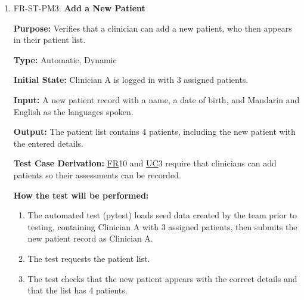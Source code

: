 \documentclass[12pt, titlepage]{article}
\newcommand{\srsfr}[1]{\href{https://github.com/Nour-Fawaz/MacaBoca/blob/main/pdfs/SRS/SRS.pdf}{FR}}
\newcommand{\srsuc}[1]{\href{https://github.com/Nour-Fawaz/MacaBoca/blob/main/pdfs/SRS/SRS.pdf}{UC}}
\renewcommand{\_}{\oldunderscore\allowbreak}
\begin{document}
\begin{enumerate}
  \item FR-ST-PM3: \textbf{Add a New Patient\\}
  \begin{mdframed}[linewidth=0.5mm]
      \textbf{Purpose:} Verifies that a clinician can add a new patient, who then appears in their patient list. \par
      \textbf{Type:} Automatic, Dynamic \par
      \textbf{Initial State:} Clinician A is logged in with 3 assigned patients. \par
      \textbf{Input:} A new patient record with a name, a date of birth, and Mandarin and English as the languages spoken. \par
      \textbf{Output:} The patient list contains 4 patients, including the new patient with the entered details. \par
      \textbf{Test Case Derivation:} \srsfr*{10} and \srsuc*{3} require that clinicians can add patients so their assessments can be recorded. \par
      \textbf{How the test will be performed:}
      \begin{enumerate}
          \item[1.] The automated test (pytest) loads seed data created by the team prior to testing, containing Clinician A with 3 assigned patients, then submits the new patient record as Clinician A.
          \item[2.] The test requests the patient list.
          \item[3.] The test checks that the new patient appears with the correct details and that the list has 4 patients.
      \end{enumerate}
  \end{mdframed}


\end{enumerate}
\end{document}
